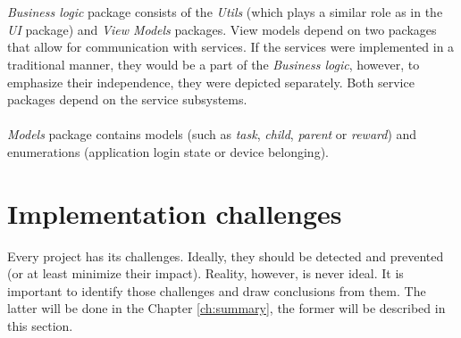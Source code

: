 \\\\ 
\textit{Business logic} package consists of the \textit{Utils} (which plays a similar role as in the \textit{UI} package) and \textit{View Models} packages. View models depend on two packages that allow for communication with services. If the services were implemented in a traditional manner, they would be a part of the \textit{Business logic}, however, to emphasize their independence, they were depicted separately. Both service packages depend on the service subsystems.
\\\\
\textit{Models} package contains models (such as \textit{task}, \textit{child}, \textit{parent} or \textit{reward}) and enumerations (application login state or device belonging).


\section{Implementation challenges}\label{sec:implementation:challenges}
Every project has its challenges. Ideally, they should be detected and prevented (or at least minimize their impact). Reality, however, is never ideal. It is important to identify those challenges and draw conclusions from them. The latter will be done in the Chapter \ref{ch:summary}, the former will be described in this section.


